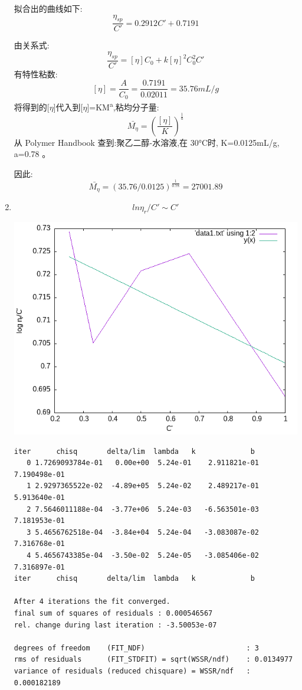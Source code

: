\documentclass[11pt]{report}
\begin{document}
\begin{enumerate}
\begin{verbatim}
\end{verbatim}
拟合出的曲线如下:
\[
\frac{\eta_{sp}}{C'}=0.2912C'+0.7191
\]

由关系式:
\[
\frac{\eta_{sp}}{C'}=[\eta]C_{0}+k[\eta]^{2}C_{0}^{2}C'
\]
有特性粘数:
\[
[\eta]=\frac{A}{C_{0}}=\frac{0.7191}{0.02011}=35.76mL/g
\]
将得到的[\(\eta\)]代入到[\(\eta\)]=KM\textsuperscript{a},粘均分子量:
\[
\bar{M_{\eta}}=\left(\frac{[\eta]}{K}\right)^{\frac{1}{a}}
\]
从 Polymer Handbook 查到:聚乙二醇-水溶液,在 30°C时, K=0.0125mL/g,
a=0.78 。

因此:
\[
\bar{M_{\eta}}=(35.76/0.0125)^{\frac{1}{0.78}}=27001.89
\]


\item 
\label{sec:org18f8919}
\[
ln\eta_{r}/C' \sim C'
\]
\begin{center}
\includegraphics[width=.9\linewidth]{../data/out1.png}
\end{center}
\begin{verbatim}
iter      chisq       delta/lim  lambda   k             b            
   0 1.7269093784e-01   0.00e+00  5.24e-01    2.911821e-01   7.190498e-01
   1 2.9297365522e-02  -4.89e+05  5.24e-02    2.489217e-01   5.913640e-01
   2 7.5646011188e-04  -3.77e+06  5.24e-03   -6.563501e-03   7.181953e-01
   3 5.4656762518e-04  -3.84e+04  5.24e-04   -3.083087e-02   7.316768e-01
   4 5.4656743385e-04  -3.50e-02  5.24e-05   -3.085406e-02   7.316897e-01
iter      chisq       delta/lim  lambda   k             b            

After 4 iterations the fit converged.
final sum of squares of residuals : 0.000546567
rel. change during last iteration : -3.50053e-07

degrees of freedom    (FIT_NDF)                        : 3
rms of residuals      (FIT_STDFIT) = sqrt(WSSR/ndf)    : 0.0134977
variance of residuals (reduced chisquare) = WSSR/ndf   : 0.000182189


\end{verbatim}
\end{enumerate}
\end{document}
